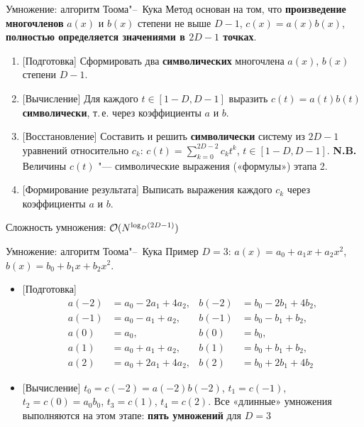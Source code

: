 \documentclass{ca-slides}
\begin{document}
\begin{canvasframe}[shrink=28]{Умножение: алгоритм Тоома"--~Кука}
  \small
  Метод основан на том, что \textbf{произведение многочленов} $a(x)$ и $b(x)$ степени не выше
  $D - 1$, $c(x) = a(x) b(x)$, \textbf{полностью определяется значениями в $2D - 1$ точках}.
  \begin{enumerate}
    \item {[Подготовка]} Сформировать два \textbf{символических} многочлена $a(x)$, $b(x)$ степени $D-1$.
    \item {[Вычисление]} Для каждого $t \in [1-D, D-1]$ выразить $c(t) = a(t) b(t)$
      \textbf{символически}, т.\,е. через коэффициенты $a$ и $b$.
    \item {[Восстановление]} Составить и решить \textbf{символически} систему из $2D-1$ уравнений
      относительно $c_k$: $c(t) = \sum_{k=0}^{2D-2} c_k t^k$, $t \in [1-D, D-1]$.
      \textbf{N.B.} Величины $c(t)$ "--- символические выражения («формулы») этапа 2.
    \item {[Формирование результата]} Выписать выражения каждого $c_k$ через коэффициенты $a$ и $b$.
  \end{enumerate}
  Сложность умножения: $\mathcal{O}(N^{\log_D (2D-1)})$
\end{canvasframe}

\begin{canvasframe}[shrink=20]{Умножение: алгоритм Тоома"--~Кука}
  \small
  Пример $D = 3$: $a(x) = a_0 + a_1 x + a_2 x^2$, $b(x) = b_0 + b_1 x + b_2 x^2$.
  \begin{itemize}
    \item {[Подготовка]}
      \[\begin{aligned}
        a(-2) &= a_0 - 2a_1 + 4a_2, & b(-2) &= b_0 - 2b_1 + 4b_2,\\
        a(-1) &= a_0 - a_1 + a_2, & b(-1) &= b_0 - b_1 + b_2,\\
        a(0) &= a_0, & b(0) &= b_0,\\
        a(1) &= a_0 + a_1 + a_2, & b(1) &= b_0 + b_1 + b_2,\\
        a(2) &= a_0 + 2a_1 + 4a_2, & b(2) &= b_0 + 2b_1 + 4b_2
      \end{aligned}\]
    \item {[Вычисление]} $t_0 = c(-2) = a(-2) b(-2)$, $t_1 = c(-1)$, $t_2 = c(0) = a_0 b_0$,
      $t_3 = c(1)$, $t_4 = c(2)$.
      Все «длинные» умножения выполняются на этом этапе: \textbf{пять умножений} для $D = 3$
  \end{itemize}
\end{canvasframe}
\end{document}
